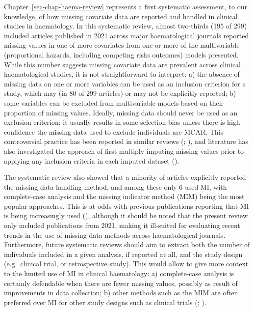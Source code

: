 \documentclass[
  letterpaper,
  DIV=11,
  numbers=noendperiod]{scrreprt}
\begin{document}
Chapter~\ref{sec-chap-haema-review} represents a first systematic
assessment, to our knowledge, of how missing covariate data are reported
and handled in clinical studies in haematology. In this systematic
review, almost two-thirds (195 of 299) included articles published in
2021 across major haematological journals reported missing values in one
of more covariates from one or more of the multivariable (proportional
hazards, including competing risks outcomes) models presented. While
this number suggests missing covariate data are prevalent across
clinical haematological studies, it is not straightforward to interpret:
a) the absence of missing data on one or more variables can be used as
an inclusion criterion for a study, which may (in 80 of 299 articles) or
may not be explicitly reported; b) some variables can be excluded from
multivariable models based on their proportion of missing values.
Ideally, missing data should never be used as an exclusion criterion: it
usually results in some selection bias unless there is high confidence
the missing data used to exclude individuals are MCAR. This
controversial practice has been reported in similar reviews
(;
), and literature has also investigated the approach of first
multiply imputing missing values prior to applying any inclusion
criteria in each imputed dataset
().

The systematic review also showed that a minority of articles explicitly
reported the missing data handling method, and among these only 6 used
MI, with complete-case analysis and the missing indicator method (MIM)
being the most popular approaches. This is at odds with previous
publications reporting that MI is being increasingly used
(), although it should be noted that the present
review only included publications from 2021, making it ill-suited for
evaluating recent trends in the use of missing data methods across
haematological journals. Furthermore, future systematic reviews should
aim to extract both the number of individuals included in a given
analysis, if reported at all, and the study design (e.g.~clinical trial,
or retrospective study). This would allow to give more context to the
limited use of MI in clinical haematology: a) complete-case analysis is
certainly defendable when there are fewer missing values, possibly as
result of improvements in data collection; b) other methods such as the
MIM are often preferred over MI for other study designs such as clinical
trials (;
).
\end{document}

